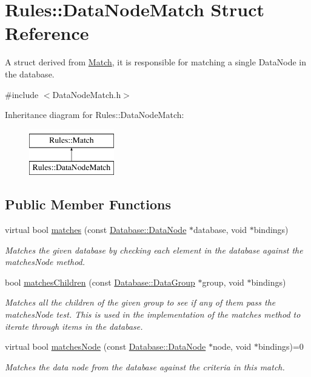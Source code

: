 \hypertarget{structRules_1_1DataNodeMatch}{}\section{Rules\+:\+:Data\+Node\+Match Struct Reference}
\label{structRules_1_1DataNodeMatch}


A struct derived from \hyperlink{structRules_1_1Match}{Match}, it is responsible for matching a single Data\+Node in the database.  




{\ttfamily \#include $<$Data\+Node\+Match.\+h$>$}

Inheritance diagram for Rules\+:\+:Data\+Node\+Match\+:\begin{figure}[H]
\begin{center}
\leavevmode
\includegraphics[height=2.000000cm]{structRules_1_1DataNodeMatch}
\end{center}
\end{figure}
\subsection*{Public Member Functions}
\begin{DoxyCompactItemize}
\item 
virtual bool \hyperlink{structRules_1_1DataNodeMatch_a9b30f5181bccbbac274f27f2a0c8421b}{matches} (const \hyperlink{classDatabase_1_1DataNode}{Database\+::\+Data\+Node} $\ast$database, void $\ast$bindings)
\begin{DoxyCompactList}\small\item\em Matches the given database by checking each element in the database against the matches\+Node method. \end{DoxyCompactList}\item 
bool \hyperlink{structRules_1_1DataNodeMatch_af96494dfe20521bc7a43eceac013d9c8}{matches\+Children} (const \hyperlink{classDatabase_1_1DataGroup}{Database\+::\+Data\+Group} $\ast$group, void $\ast$bindings)
\begin{DoxyCompactList}\small\item\em Matches all the children of the given group to see if any of them pass the matches\+Node test. This is used in the implementation of the matches method to iterate through items in the database. \end{DoxyCompactList}\item 
virtual bool \hyperlink{structRules_1_1DataNodeMatch_a9b2515abf3ef2b216cfc4ea18e95e07d}{matches\+Node} (const \hyperlink{classDatabase_1_1DataNode}{Database\+::\+Data\+Node} $\ast$node, void $\ast$bindings)=0
\begin{DoxyCompactList}\small\item\em Matches the data node from the database against the criteria in this match. \end{DoxyCompactList}\end{DoxyCompactItemize}
